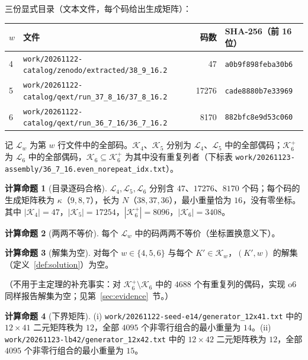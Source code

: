 \documentclass[11pt]{ctexart}
\theoremstyle{definition}
\newtheorem{compclaim}{计算命题}
\begin{document}
三份显式目录（文本文件，每个码给出生成矩阵）：
\begin{center}
\begin{tabular}{llrl}
\toprule
$w$ & 文件 & 码数 & SHA-256（前 16 位）\\
\midrule
4 & \texttt{work/20261122-catalog/zenodo/extracted/38\_9\_16.2} & 47 & \texttt{a0b9f898feba30b6}\\
5 & \texttt{work/20261122-catalog/qext/run\_37\_8\_16/37\_8\_16.2} & 17276 & \texttt{cade8880b7e33969}\\
6 & \texttt{work/20261122-catalog/qext/run\_36\_7\_16/36\_7\_16.2} & 8170 & \texttt{882bfc8e9d53c060}\\
\bottomrule
\end{tabular}
\end{center}
记 $\mathcal L_w$ 为第 $w$ 行文件中的全部码。$\mathcal K_4$、$\mathcal K_5$ 分别为 $\mathcal L_4$、$\mathcal L_5$ 中的全部偶码；$\mathcal K_6^{+}$ 为 $\mathcal L_6$ 中的全部偶码，$\mathcal K_6\subseteq\mathcal K_6^{+}$ 为其中没有重复列者（下标表 \texttt{work/20261123-assembly/36\_7\_16.even\_norepeat\_idx.txt}）。

\begin{compclaim}[目录逐码合格]\label{cc:catalog}
$\mathcal L_4,\mathcal L_5,\mathcal L_6$ 分别含 $47$、$17276$、$8170$ 个码；每个码的生成矩阵秩为 $\kappa$（$9,8,7$），长为 $N$（$38,37,36$），最小重量恰为 $16$，没有零坐标。其中 $|\mathcal K_4|=47$，$|\mathcal K_5|=17254$，$|\mathcal K_6^{+}|=8096$，$|\mathcal K_6|=3408$。
\end{compclaim}

\begin{compclaim}[两两不等价]\label{cc:ineq}
每个 $\mathcal L_w$ 中的码两两不等价（坐标置换意义下）。
\end{compclaim}

\begin{compclaim}[解集为空]\label{cc:search}
对每个 $w\in\{4,5,6\}$ 与每个 $K'\in\mathcal K_w$，$(K',w)$ 的解集（定义~\ref{def:solution}）为空。

\noindent（不用于主定理的补充事实：对 $\mathcal K_6^{+}\setminus\mathcal K_6$ 中的 $4688$ 个有重复列的偶码，实现 o6 同样报告解集为空；见第~\ref{sec:evidence}~节。）
\end{compclaim}

\begin{compclaim}[下界矩阵]\label{cc:seed}
(i) \texttt{work/20261122-seed-e14/generator\_12x41.txt} 中的 $12\times41$ 二元矩阵秩为 $12$，全部 $4095$ 个非零行组合的最小重量为 $14$。(ii) \texttt{work/20261123-lb42/generator\_12x42.txt} 中的 $12\times42$ 二元矩阵秩为 $12$，全部 $4095$ 个非零行组合的最小重量为 $15$。
\end{compclaim}
\end{document}
